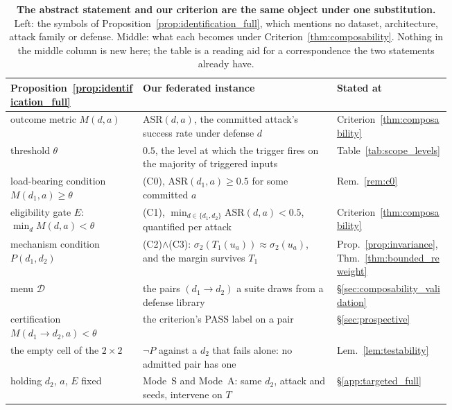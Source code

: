 \documentclass{article}
\begin{document}
\begin{table}[h]
\centering\small
\caption{\textbf{The abstract statement and our criterion are the same object under one substitution.} Left: the symbols of Proposition~\ref{prop:identification_full}, which mentions no dataset, architecture, attack family or defense. Middle: what each becomes under Criterion~\ref{thm:composability}. Nothing in the middle column is new here; the table is a reading aid for a correspondence the two statements already have.}
\label{tab:mapping}
\begin{tabular}{p{0.30\linewidth}p{0.44\linewidth}l}
\toprule
Proposition~\ref{prop:identification_full} & Our federated instance & Stated at \\
\midrule
outcome metric $M(d,a)$ & $\mathrm{ASR}(d,a)$, the committed attack's success rate under defense $d$ & Criterion~\ref{thm:composability} \\
threshold $\theta$ & $0.5$, the level at which the trigger fires on the majority of triggered inputs & Table~\ref{tab:scope_levels} \\
load-bearing condition\newline $M(d_1,a) \ge \theta$ & (C0), $\mathrm{ASR}(d_1,a) \ge 0.5$ for some committed $a$ & Rem.~\ref{rem:c0} \\
eligibility gate $E$:\newline $\min_{d} M(d,a) < \theta$ & (C1), $\min_{d\in\{d_1,d_2\}}\mathrm{ASR}(d,a) < 0.5$, quantified per attack & Criterion~\ref{thm:composability} \\
mechanism condition $P(d_1,d_2)$ & (C2)$\wedge$(C3): $\sigma_2(T_1(u_a)) \approx \sigma_2(u_a)$, and the margin survives $T_1$ & Prop.~\ref{prop:invariance}, Thm.~\ref{thm:bounded_reweight} \\
menu $\mathcal{D}$ & the pairs $(d_1 \to d_2)$ a suite draws from a defense library & §\ref{sec:composability_validation} \\
certification $M(d_1\!\to\! d_2,a) < \theta$ & the criterion's PASS label on a pair & §\ref{sec:prospective} \\
the empty cell of the $2\times2$ & $\neg P$ against a $d_2$ that fails alone: no admitted pair has one & Lem.~\ref{lem:testability} \\
holding $d_2$, $a$, $E$ fixed & Mode~S and Mode~A: same $d_2$, attack and seeds, intervene on $T$ & §\ref{app:targeted_full} \\
\bottomrule
\end{tabular}
\end{table}
\end{document}
